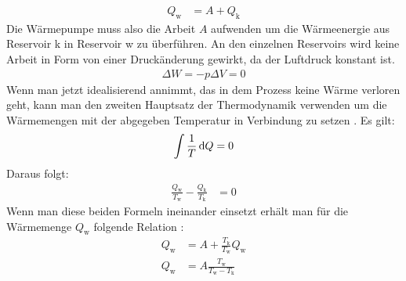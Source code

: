 \begin{align}
    Q_\text{w}    &= A +  Q_\text{k} %
\end{align}
%
Die Wärmepumpe muss also die Arbeit $A$ aufwenden um die Wärmeenergie aus Reservoir k in Reservoir w zu überführen.
An den einzelnen Reservoirs wird keine Arbeit in Form von einer Druckänderung gewirkt, da der Luftdruck konstant ist.
\begin{align*}
    \Delta W = - p \Delta V = 0 
\end{align*}
Wenn man jetzt idealisierend annimmt, das in dem Prozess keine Wärme verloren geht, kann man den zweiten Hauptsatz der Thermodynamik
verwenden um die Wärmemengen mit der abgegeben Temperatur in Verbindung zu setzen \cite[vgl.][1]{man:v206}. 
Es gilt:
\begin{align*}
    \int \frac{1}{T} \diff Q = 0 %
\end{align*}
Daraus folgt:
\begin{align}
    \frac{Q_\text{w}}{T_\text{w}} - \frac{Q_\text{k}}{T_\text{k}} &= 0
\end{align}
Wenn man diese beiden Formeln ineinander einsetzt erhält man für die Wärmemenge $Q_\text{w}$ folgende Relation \cite{man:v206}: 
\begin{align}
\nonumber    Q_\text{w} &= A + \frac{T_\text{k}}{T_\text{w}}Q_\text{w} \\
    Q_\text{w} &= A \frac{T_\text{w}}{T_\text{w} - T_\text{k}}
\end{align}
